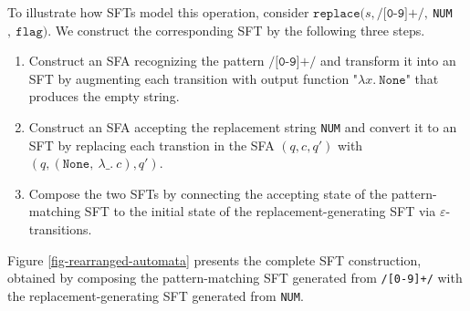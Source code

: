 
To illustrate how SFTs model this operation, consider $\texttt{replace}(s, \texttt{/[0-9]+/},~$\texttt{NUM}$,~\texttt{flag})$. We construct the corresponding SFT by the following three steps.

\begin{enumerate}
  \item Construct an SFA recognizing the pattern $\texttt{/[0-9]+/}$ and transform it into an SFT by augmenting each transition with output function "$\lambda x.~\texttt{None}$" that produces the empty string.
  \item Construct an SFA accepting the replacement string \texttt{NUM} and convert it to an SFT by
  replacing each transtion in the SFA $(q, c, q')$ with
  $(q, (\texttt{None},~\lambda \_.~c ), q')$.
  \item Compose the two SFTs by connecting the accepting state of the pattern-matching SFT to the initial state of the replacement-generating SFT via $\varepsilon$-transitions.
\end{enumerate}



Figure \ref{fig-rearranged-automata} presents the complete SFT construction, obtained by composing the pattern-matching SFT generated from \texttt{/[0-9]+/}  with the replacement-generating SFT generated from \texttt{NUM}.

